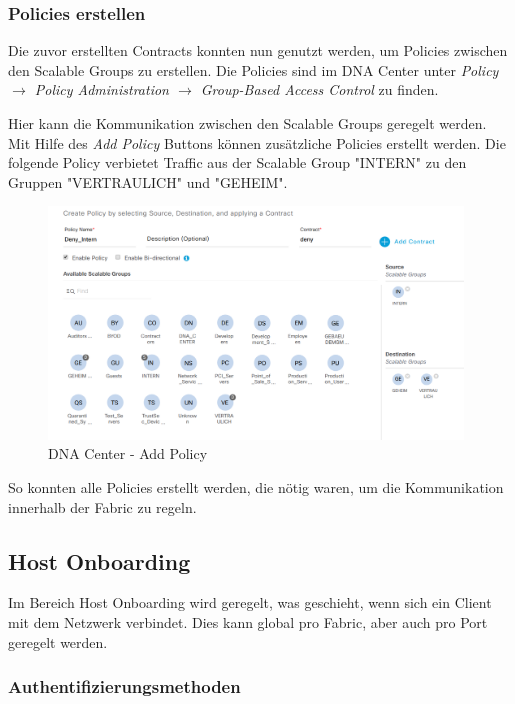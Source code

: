\subsubsection{Policies erstellen}

Die zuvor erstellten Contracts konnten nun genutzt werden, um Policies zwischen den Scalable Groups zu erstellen. Die Policies sind im DNA Center unter \textit{Policy $\rightarrow$ Policy Administration $\rightarrow$ Group-Based Access Control} zu finden.

Hier kann die Kommunikation zwischen den Scalable Groups geregelt werden. Mit Hilfe des \textit{Add Policy} Buttons können zusätzliche Policies erstellt werden. Die folgende Policy verbietet Traffic aus der Scalable Group "INTERN" zu den Gruppen "VERTRAULICH" und "GEHEIM".

\begin{figure}[H]
	\centering
	\includegraphics[width=11cm]{img/secondtry/dna-center-add-policy.png}
	\caption{DNA Center - Add Policy}
	\label{fig:dna-center-add-policy}
\end{figure}

So konnten alle Policies erstellt werden, die nötig waren, um die Kommunikation innerhalb der Fabric zu regeln.

\subsection{Host Onboarding}

Im Bereich Host Onboarding wird geregelt, was geschieht, wenn sich ein Client mit dem Netzwerk verbindet. Dies kann global pro Fabric, aber auch pro Port geregelt werden.


\subsubsection{Authentifizierungsmethoden}

